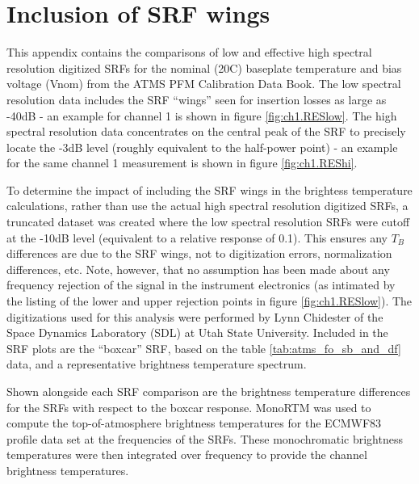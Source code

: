 \section{Inclusion of SRF wings}
\label{app:Rset}
This appendix contains the comparisons of low and effective high spectral resolution digitized SRFs for the nominal (20\textdegree{}C) baseplate temperature and bias voltage (Vnom) from the ATMS PFM Calibration Data Book\cite{ATMS_PFM_CalLog}. The low spectral resolution data includes the SRF ``wings'' seen for insertion losses as large as -40dB - an example for channel 1 is shown in figure \ref{fig:ch1.RESlow}. The high spectral resolution data concentrates on the central peak of the SRF to precisely locate the -3dB level (roughly equivalent to the half-power point) - an example for the same channel 1 measurement is shown in figure \ref{fig:ch1.REShi}.

To determine the impact of including the SRF wings in the brightess temperature calculations, rather than use the actual high spectral resolution digitized SRFs, a truncated dataset was created where the low spectral resolution SRFs were cutoff at the -10dB level (equivalent to a relative response of 0.1). This ensures any $T_B$ differences are due to the SRF wings, not to digitization errors, normalization differences, etc. Note, however, that no assumption has been made about any frequency rejection of the signal in the instrument electronics (as intimated by the listing of the lower and upper rejection points in figure \ref{fig:ch1.RESlow}). The digitizations used for this analysis were performed by Lynn Chidester of the Space Dynamics Laboratory (SDL) at Utah State University. Included in the SRF plots are the ``boxcar'' SRF, based on the table \ref{tab:atms_fo_sb_and_df} data, and a representative brightness temperature spectrum.

Shown alongside each SRF comparison are the brightness temperature differences for the SRFs with respect to the boxcar response. MonoRTM \cite{Clough_2005} was used to compute the top-of-atmosphere brightness temperatures for the ECMWF83 profile data set \cite{ECMWF_profile_set2,Matricardi_ECMWF564} at the frequencies of the SRFs. These monochromatic brightness temperatures were then integrated over frequency to provide the channel brightness temperatures.

\newpage
 
